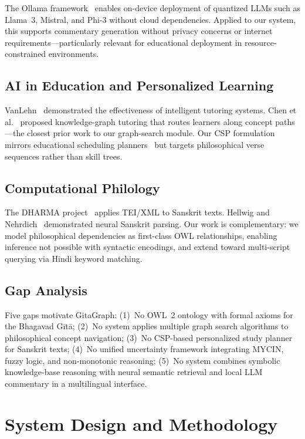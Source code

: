 \documentclass[conference]{IEEEtran}
\begin{document}
The Ollama framework~\cite{ollama2024} enables on-device deployment of
quantized LLMs such as Llama~3, Mistral, and Phi-3 without cloud dependencies.
Applied to our system, this supports commentary generation without privacy
concerns or internet requirements—particularly relevant for educational
deployment in resource-constrained environments.

\subsection{AI in Education and Personalized Learning}

VanLehn~\cite{vanlehn2011relative} demonstrated the effectiveness of
intelligent tutoring systems. Chen et al.~\cite{chen2018kgtutor} proposed
knowledge-graph tutoring that routes learners along concept paths—the closest
prior work to our graph-search module. Our CSP formulation mirrors educational
scheduling planners~\cite{kumar1992algorithms} but targets philosophical verse
sequences rather than skill trees.

\subsection{Computational Philology}

The DHARMA project~\cite{dharma2020} applies TEI/XML to Sanskrit texts.
Hellwig and Nehrdich~\cite{hellwig2018sanskrit} demonstrated neural Sanskrit
parsing. Our work is complementary: we model philosophical dependencies as
first-class OWL relationships, enabling inference not possible with syntactic
encodings, and extend toward multi-script querying via Hindi keyword matching.

\subsection{Gap Analysis}

Five gaps motivate GitaGraph:
(1)~No OWL~2 ontology with formal axioms for the Bhagavad G\={i}t\={a};
(2)~No system applies multiple graph search algorithms to philosophical
concept navigation;
(3)~No CSP-based personalized study planner for Sanskrit texts;
(4)~No unified uncertainty framework integrating MYCIN, fuzzy logic, and
non-monotonic reasoning;
(5)~No system combines symbolic knowledge-base reasoning with neural
semantic retrieval and local LLM commentary in a multilingual interface.

\section{System Design and Methodology}
\end{document}
